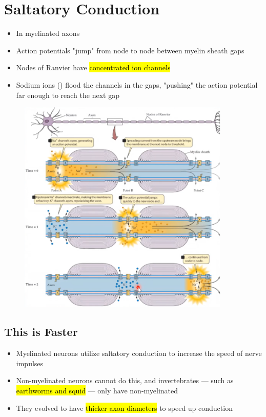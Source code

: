 \documentclass[a4paper,12pt]{article}
\begin{document}
\section{Saltatory Conduction}
\begin{itemize}
    \item{In myelinated axons}
    \item{Action potentials "jump" from node to node between myelin sheath gaps}
    \item{Nodes of Ranvier have \hl{concentrated ion channels}}
    \item{Sodium ions () flood the channels in the gaps, "pushing" the action potential far enough to reach the next gap}
\end{itemize}
\begin{figure}[H]
    \centering
    \includegraphics[width=0.9\textwidth]{salt}
\end{figure}

\subsection{This is Faster}
\begin{itemize}
    \item{Myelinated neurons utilize saltatory conduction to increase the speed of nerve impulses}
    \item{Non-myelinated neurons cannot do this, and invertebrates --- such as \hl{earthworms and squid} --- only have non-myelinated}
    \item{They evolved to have \hl{thicker axon diameters} to speed up conduction}
\end{itemize}
\end{document}
